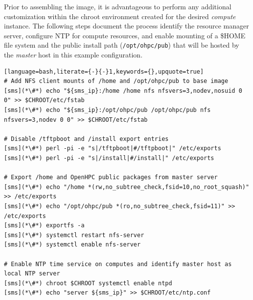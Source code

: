 Prior to assembling the image, it is advantageous to perform any additional
customization within the chroot environment created for the desired {\em
 compute} instance. The following steps document the process identify the
resource manager server, configure NTP for compute resources, and enable \NFS{}
mounting of a \$HOME file system and the public \OHPC{} install path
(\texttt{/opt/ohpc/pub}) that will be hosted by the {\em master} host in this
example configuration.

\begin{lstlisting}[language=bash,literate={-}{-}1,keywords={},upquote=true]
# Add NFS client mounts of /home and /opt/ohpc/pub to base image
[sms](*\#*) echo "${sms_ip}:/home /home nfs nfsvers=3,nodev,nosuid 0 0" >> $CHROOT/etc/fstab
[sms](*\#*) echo "${sms_ip}:/opt/ohpc/pub /opt/ohpc/pub nfs nfsvers=3,nodev 0 0" >> $CHROOT/etc/fstab

# Disable /tftpboot and /install export entries
[sms](*\#*) perl -pi -e "s|/tftpboot|#/tftpboot|" /etc/exports
[sms](*\#*) perl -pi -e "s|/install|#/install|" /etc/exports

# Export /home and OpenHPC public packages from master server
[sms](*\#*) echo "/home *(rw,no_subtree_check,fsid=10,no_root_squash)" >> /etc/exports
[sms](*\#*) echo "/opt/ohpc/pub *(ro,no_subtree_check,fsid=11)" >> /etc/exports
[sms](*\#*) exportfs -a
[sms](*\#*) systemctl restart nfs-server
[sms](*\#*) systemctl enable nfs-server

# Enable NTP time service on computes and identify master host as local NTP server
[sms](*\#*) chroot $CHROOT systemctl enable ntpd
[sms](*\#*) echo "server ${sms_ip}" >> $CHROOT/etc/ntp.conf

\end{lstlisting}

